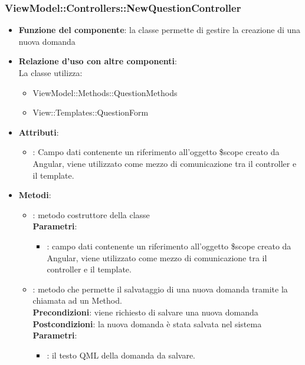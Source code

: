 \subsubsection{ViewModel::Controllers::NewQuestionController}
\begin{itemize}
\item\textbf{Funzione del componente}: la classe permette di gestire la creazione di una nuova domanda
	\item\textbf{Relazione d'uso con altre componenti}: \\
La classe utilizza:
	\begin{itemize}
		\item ViewModel::Methods::QuestionMethods
		\item View::Templates::QuestionForm
	\end{itemize}
\item\textbf{Attributi}:
	\begin{itemize}
		\item{}: Campo dati contenente un riferimento all’oggetto \$scope creato da Angular, viene utilizzato come mezzo di comunicazione tra il controller e il template.\\
	\end{itemize}
\item\textbf{Metodi}:
	\begin{itemize}
		\item{}: metodo costruttore della classe\\
		\textbf{Parametri}:
			\begin{itemize}
				\item{}: campo dati contenente un riferimento all’oggetto \$scope creato da Angular, viene utilizzato come mezzo di comunicazione tra il controller e il template.\\
			\end{itemize}
		\item{}: metodo che permette il salvataggio di una nuova domanda tramite la chiamata ad un Method.\\
		\textbf{Precondizioni}: viene richiesto di salvare una nuova domanda\\
		\textbf{Postcondizioni}: la nuova domanda è stata salvata nel sistema\\
		\textbf{Parametri}:
			\begin{itemize}
				\item{}: il testo QML della domanda da salvare.\\

\end{itemize}
\end{itemize}
\end{itemize}

